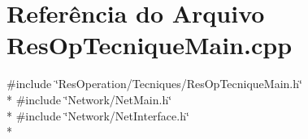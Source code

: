 \section{Referência do Arquivo Res\+Op\+Tecnique\+Main.\+cpp}
\label{_res_op_tecnique_main_8cpp}
{\ttfamily \#include \char`\"{}Res\+Operation/\+Tecniques/\+Res\+Op\+Tecnique\+Main.\+h\char`\"{}}\\*
{\ttfamily \#include \char`\"{}Network/\+Net\+Main.\+h\char`\"{}}\\*
{\ttfamily \#include \char`\"{}Network/\+Net\+Interface.\+h\char`\"{}}\\*
